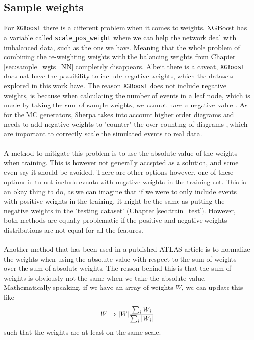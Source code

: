 \documentclass[12pt, a4paper]{book}
\begin{document}
\subsection{Sample weights}\label{sec:bdt_wgts}
For \verb|XGBoost| there is a different problem when it comes to weights. XGBoost has a variable called \verb|scale_pos_weight| where we can help the network deal with imbalanced data, such as the one we have. 
Meaning that the whole problem of combining the re-weighting weights with the balancing weights from Chapter \ref{sec:sample_wgts_NN} completely disappears. Albeit there is a caveat, \verb|XGBoost| does not have the possibility to include negative weights, which the datasets explored in this work have. The reason \verb|XGBoost| 
does not include negative weights, is because when calculating the number of events in a leaf node, which is made by taking the sum of sample weights, we cannot have a negative value \cite{neg_wgt_xbg1, neg_wgt_xbg2}.
As for the MC generators, Sherpa \cite{Sherpa} takes into account higher order diagrams and needs to add negative weights to "counter" the over counting of diagrams \cite{Negative_Weights_article}, which are important to correctly scale the simulated events to real data.\\
\\A method to mitigate this problem is to use the absolute value of the weights when training. This is however not generally accepted as a solution, and some even say it should be avoided. There are other options however, one of these options is to not include events with negative weights in the training set. 
This is an okay thing to do, as we can imagine that if we were to only include events with positive weights in the training, it might be the same as putting the negative weights in the "testing dataset" (Chapter \ref{sec:train_test}). 
However, both methods are equally problematic if the positive and negative weights distributions are not equal for all the features.\\
\\Another method that has been used in a published ATLAS article \cite{Abbott:2714377} is to normalize the weights when using the absolute value with respect to the sum of weights over the sum of absolute weights. The reason behind this is that the sum of weights is obviously not the same when we take the absolute value. 
Mathematically speaking, if we have an array of weights $W$, we can update this like
\begin{equation}\label{eq:ATLAS_wgt}
   W \rightarrow \abs{W}\frac{\sum_i W_i}{\sum_i\abs{W_i}}
\end{equation}
such that the weights are at least on the same scale. 
\end{document}
